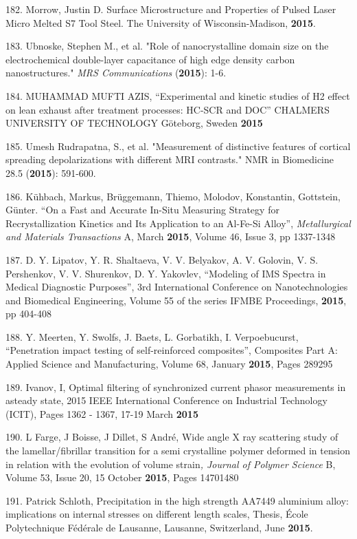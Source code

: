 182. Morrow, Justin D. Surface Microstructure and Properties of Pulsed Laser Micro Melted S7 Tool Steel. The University of Wisconsin-Madison, \textbf{2015}.

183. Ubnoske, Stephen M., et al. "Role of nanocrystalline domain size on the electrochemical double-layer capacitance of high edge density carbon nanostructures." \textit{MRS Communications} (\textbf{2015}): 1-6.

184. MUHAMMAD MUFTI AZIS, ``Experimental and kinetic studies of H2 effect on lean exhaust after treatment processes: HC-SCR and DOC'' CHALMERS UNIVERSITY OF TECHNOLOGY G\"{o}teborg, Sweden \textbf{2015}

185. Umesh Rudrapatna, S., et al. "Measurement of distinctive features of cortical spreading depolarizations with different MRI contrasts." NMR in Biomedicine 28.5 (\textbf{2015}): 591-600.

186. K\"{u}hbach, Markus, Br\"{u}ggemann, Thiemo, Molodov, Konstantin, Gottstein, G\"{u}nter. ``On a Fast and Accurate In-Situ Measuring Strategy for Recrystallization Kinetics and Its Application to an Al-Fe-Si Alloy'', \textit{Metallurgical and Materials Transactions} A, March \textbf{2015}, Volume 46, Issue 3, pp 1337-1348

187. D. Y. Lipatov, Y. R. Shaltaeva, V. V. Belyakov, A. V. Golovin, V. S. Pershenkov, V. V. Shurenkov, D. Y. Yakovlev, ``Modeling of IMS Spectra in Medical Diagnostic Purposes'', 3rd International Conference on Nanotechnologies and Biomedical Engineering, Volume 55 of the series IFMBE Proceedings, \textbf{2015}, pp 404-408

188. Y. Meerten, Y. Swolfs, J. Baets, L. Gorbatikh, I. Verpoebucurst, ``Penetration impact testing of self-reinforced composites'', Composites Part A: Applied Science and Manufacturing, Volume 68, January \textbf{2015}, Pages 289\textendash{}295

189. Ivanov, I, Optimal filtering of synchronized current phasor measurements in asteady state, 2015 IEEE International Conference on Industrial Technology (ICIT), Pages 1362 - 1367, 17-19 March \textbf{2015}

190. L Farge, J Boisse, J Dillet, S Andr\'{e}, Wide angle X ray scattering study of the lamellar/fibrillar transition for a semi crystalline polymer deformed in tension in relation with the evolution of volume strain\textit{, Journal of Polymer Science} B, Volume 53, Issue 20, 15 October \textbf{2015}, Pages 1470\textendash{}1480

191. Patrick Schloth, Precipitation in the high strength AA7449 aluminium alloy: implications on internal stresses on different length scales, Thesis, \'{E}cole Polytechnique F\'{e}d\'{e}rale de Lausanne, Lausanne, Switzerland, June \textbf{2015}.

